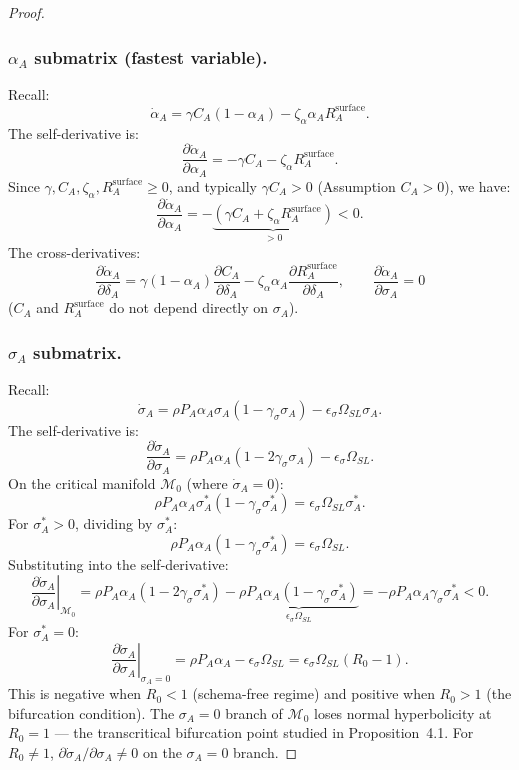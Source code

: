\begin{proof}
\subsubsection*{$\alpha_A$ submatrix (fastest variable).}
Recall:
\[
\dot{\alpha}_A = \gamma C_A (1 - \alpha_A) - \zeta_\alpha \alpha_A R_A^{\text{surface}}.
\]
The self-derivative is:
\[
\frac{\partial \dot{\alpha}_A}{\partial \alpha_A} = -\gamma C_A - \zeta_\alpha R_A^{\text{surface}}.
\]
Since $\gamma, C_A, \zeta_\alpha, R_A^{\text{surface}} \geq 0$,
and typically $\gamma C_A > 0$ (Assumption $C_A > 0$), we have:
\[
\frac{\partial \dot{\alpha}_A}{\partial \alpha_A} = -\underbrace{(\gamma C_A + \zeta_\alpha R_A^{\text{surface}})}_{>0} < 0.
\]
The cross-derivatives:
\[
\frac{\partial \dot{\alpha}_A}{\partial \delta_A} = \gamma (1 - \alpha_A) \frac{\partial C_A}{\partial \delta_A}
- \zeta_\alpha \alpha_A \frac{\partial R_A^{\text{surface}}}{\partial \delta_A},
\qquad
\frac{\partial \dot{\alpha}_A}{\partial \sigma_A} = 0
\]
($C_A$ and $R_A^{\text{surface}}$ do not depend directly on $\sigma_A$).

\subsubsection*{$\sigma_A$ submatrix.}
Recall:
\[
\dot{\sigma}_A = \rho P_A \alpha_A \sigma_A (1 - \gamma_\sigma \sigma_A) - \epsilon_\sigma \Omega_{SL} \sigma_A.
\]
The self-derivative is:
\[
\frac{\partial \dot{\sigma}_A}{\partial \sigma_A} = \rho P_A \alpha_A (1 - 2\gamma_\sigma \sigma_A) - \epsilon_\sigma \Omega_{SL}.
\]
On the critical manifold $\mathcal{M}_0$ (where $\dot{\sigma}_A = 0$):
\[
\rho P_A \alpha_A \sigma_A^*(1 - \gamma_\sigma \sigma_A^*) = \epsilon_\sigma \Omega_{SL} \sigma_A^*.
\]
For $\sigma_A^* > 0$, dividing by $\sigma_A^*$:
\[
\rho P_A \alpha_A (1 - \gamma_\sigma \sigma_A^*) = \epsilon_\sigma \Omega_{SL}.
\]
Substituting into the self-derivative:
\[
\left.\frac{\partial \dot{\sigma}_A}{\partial \sigma_A}\right|_{\mathcal{M}_0}
= \rho P_A \alpha_A (1 - 2\gamma_\sigma \sigma_A^*) - \underbrace{\rho P_A \alpha_A (1 - \gamma_\sigma \sigma_A^*)}_{\epsilon_\sigma \Omega_{SL}}
= -\rho P_A \alpha_A \gamma_\sigma \sigma_A^* < 0.
\]
For $\sigma_A^* = 0$:
\[
\left.\frac{\partial \dot{\sigma}_A}{\partial \sigma_A}\right|_{\sigma_A=0}
= \rho P_A \alpha_A - \epsilon_\sigma \Omega_{SL} = \epsilon_\sigma \Omega_{SL} (R_0 - 1).
\]
This is negative when $R_0 < 1$ (schema-free regime) and positive when
$R_0 > 1$ (the bifurcation condition). The $\sigma_A = 0$ branch of
$\mathcal{M}_0$ loses normal hyperbolicity at $R_0 = 1$ --- the
transcritical bifurcation point studied in Proposition~4.1. For
$R_0 \neq 1$, $\partial \dot{\sigma}_A / \partial \sigma_A \neq 0$ on the
$\sigma_A = 0$ branch.


\end{proof}
